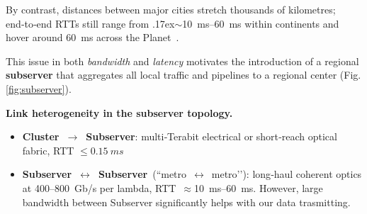 \documentclass{article}
\begin{document}
By contrast, distances between major cities stretch thousands of kilometres; end‑to‑end RTTs still range from {\raise.17ex\hbox{$\scriptstyle\sim$}}\SIrange{10}{60}{\milli\second} within continents and hover around \SI{60}{\milli\second} across the Planet \cite{equinix_latency_2023}. 

This issue in both \emph{bandwidth} and \emph{latency} motivates the introduction of a regional \textbf{subserver} that aggregates all local traffic and pipelines to a regional center (Fig.\,\ref{fig:subserver}).

\medskip
{\bf Link heterogeneity in the subserver topology.}  
\begin{itemize}\setlength\itemsep{0.3em}
    \item \textbf{Cluster $\to$ Subserver}: multi‑Terabit electrical or short‑reach optical fabric, RTT $\le\SI{0.15}{ms}$
    \item \textbf{Subserver $\leftrightarrow$ Subserver} (“metro $\leftrightarrow$ metro’’): long‑haul coherent optics at 400–800 Gb/s per lambda, RTT $\approx$\SIrange{10}{60}{ms}.  However, large bandwidth between Subserver significantly helps with our data trasmitting.
\end{itemize}









\end{document}
